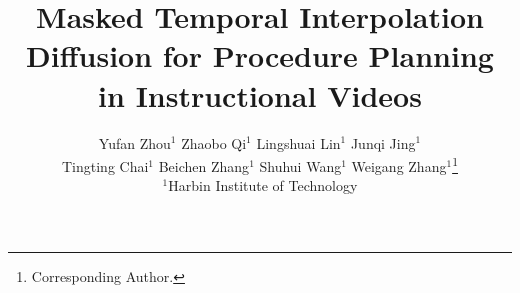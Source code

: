 \documentclass[pdftex]{article}
\title{Masked Temporal Interpolation Diffusion for Procedure Planning in Instructional Videos}
\author{
    \quad \quad \quad \quad  Yufan Zhou$^1$ \quad Zhaobo Qi$^1$ \quad Lingshuai Lin$^1$ \quad Junqi Jing$^1$ \\ 
    \quad \quad \quad \quad  Tingting Chai$^1$ \quad Beichen Zhang$^1$ \quad Shuhui Wang$^1$ \quad Weigang Zhang$^1$\thanks{Corresponding Author.}
    \\
    \quad \quad \quad \quad \quad  $^1$Harbin Institute of Technology 
}
\begin{document}
\maketitle







\FloatBarrier

\end{document}
